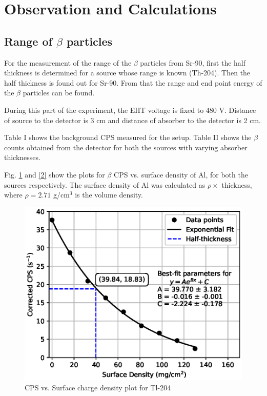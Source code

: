 \section{Observation and Calculations}

\subsection{Range of $\beta$ particles}

For the measurement of the range of the $\beta$ particles
from Sr-90, first the half thickness is determined for
a source whose range is known (Th-204). Then the half thickness is found out for Sr-90. From that the range and
end point energy of the $\beta$ particles can be found.

During this part of the experiment, the EHT voltage is fixed to 480 V. Distance of source to the detector is 3 cm and distance of absorber to the detector is 2 cm.

Table I shows the background CPS measured for the setup. Table II shows the $\beta$ counts obtained from the detector for both the sources with varying absorber thicknesses.




Fig. \ref{1} and \ref{2} show the plots for $\beta$ CPS vs. surface density of Al, for both the sources respectively. The surface density of Al was calculated as $\rho \times$ thickness, where $\rho = 2.71$ g/cm$^3$ is the volume density. 

\begin{figure}
    \centering
    \includegraphics[width=1\columnwidth]{images/Tl.eps}
    \caption{CPS vs. Surface charge density plot for Tl-204}
    \label{1}
\end{figure}

